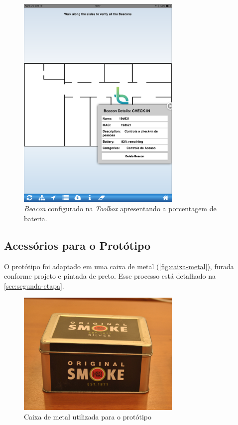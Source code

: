 \documentclass[
		12pt,				%
		openright,			%
		oneside,			%
		a4paper,			%
		chapter=TITLE,		%
		english,			%
		brazil				%
	]{abntex2}
\begin{document}
\begin{figure}[htb]
	\caption{\label{fig:exemplo-toolbox}\textit{Beacon} configurado na \textit{Toolbox} apresentando a porcentagem de bateria.}
	\begin{center}
		\includegraphics[width=0.7\textwidth]{img/toolbox-exemplo.png}
	\end{center}
\end{figure}

\subsection{Acessórios para o Protótipo}\label{sec:acess-prototipo}

O protótipo foi adaptado em uma caixa de metal (\autoref{fig:caixa-metal}), furada conforme projeto e pintada de preto. Esse processo está detalhado na \autoref{sec:segunda-etapa}. 

\begin{figure}[htb]
	\caption{\label{fig:caixa-metal}Caixa de metal utilizada para o protótipo}
	\begin{center}
		\includegraphics[width=0.7\textwidth]{img/caixa-metal.jpg}
	\end{center}
\end{figure}
\end{document}
